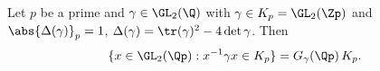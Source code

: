 Let $p$ be a prime and $\gamma\in\GL_2(\Q)$ with $\gamma\in K_p=\GL_2(\Zp)$ and $\abs{\Delta(\gamma)}_p=1$, $\Delta(\gamma)=\tr(\gamma)^2-4\det\gamma$. Then
\[
  \{x\in\GL_2(\Qp):x^{-1}\gamma x\in K_p\}=G_\gamma(\Qp)\,K_p .
\]
